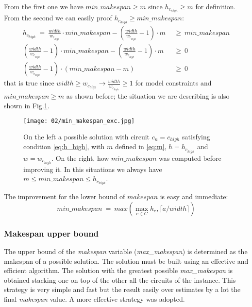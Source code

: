         From the first one we have $min\_makespan \geq m$ since $h_{c_{high}} \geq m$ for definition.
        From the second we can easily proof $h_{c_{high}} \geq min\_makespan$:
        \begin{align*}
            h_{c_{high}}\ =\ \frac{width}{w_{c_{high}}} \cdot min\_makespan - \left( \frac{width}{w_{c_{high}}} - 1\right) \cdot m\ &\ \geq\ min\_makespan       \\
            \left( \frac{width}{w_{c_{high}}} - 1\right) \cdot min\_makespan - \left( \frac{width}{w_{c_{high}}} - 1\right) \cdot m\ &\ \geq\ 0 \\
            \left( \frac{width}{w_{c_{high}}} - 1\right) \cdot \left(min\_makespan - m\right) \ &\ \geq\ 0
        \end{align*}
        that is true since $width \geq w_{c_{high}} \rightarrow \frac{width}{w_{c_{high}}} \geq 1$ for model constraints and $min\_makespan \geq m$ as shown before;
        the situation we are describing is also shown in Fig.\ref{fig:min_makespan}. 

        \begin{figure}[H]
            \centering
            \texttt{[image: 02/min\_makespan\_exc.jpg]}
            \caption{
                On the left a possible solution with circuit $c_n=c_{high}$ satisfying condition \ref{eq:h_high}, 
                with $m$ defined in \ref{eq:m}, $h = h_{c_{high}}$ and $w = w_{c_{high}}$. On the right, how $min\_makespan$ 
                was computed before improving it. In this situations we always have $m \leq min\_makespan \leq h_{c_{high}}$.
            }
            \label{fig:min_makespan}
        \end{figure}
        
        The improvement for the lower bound of $makespan$ is easy and immediate:
        \begin{equation}
            min\_makespan\ =\ max\left(\max_{c \in C} h_c, \lceil a / width \rceil\right)
        \end{equation}

    \subsubsection{Makespan upper bound}
        The upper bound of the \textit{makespan} variable (\textit{max\_makespan}) is determined as the makespan of a possible 
        solution. The solution must be built using an effective and efficient algorithm. 
        The solution with the greatest possible \textit{max\_makespan} is obtained stacking one on top of the other all the circuits
        of the instance. This strategy is very simple and fast but the result easily over estimates by a lot the final 
        \textit{makespan} value. A more effective strategy was adopted.
        
